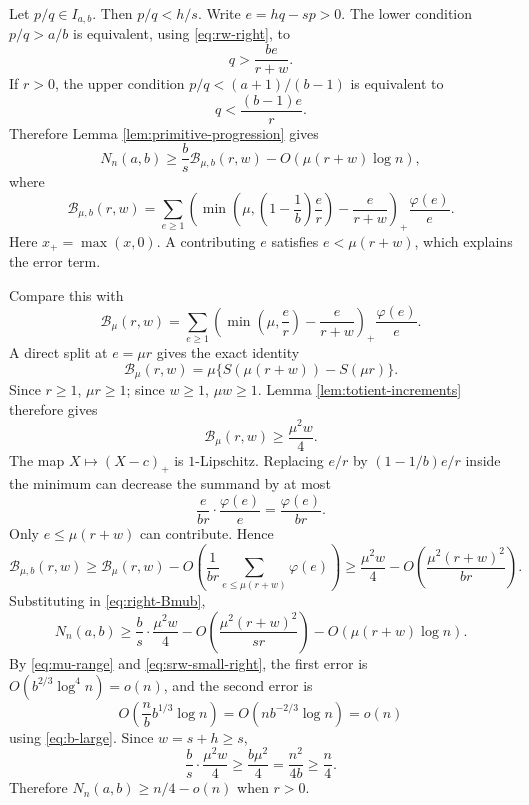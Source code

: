 \documentclass[11pt]{article}
\numberwithin{equation}{section}
\theoremstyle{definition}
\theoremstyle{remark}
\newcommand{\1}{\mathbf 1}
\begin{document}
Let $p/q\in I_{a,b}$.  Then $p/q<h/s$.  Write $e=hq-sp>0$.  The lower condition $p/q>a/b$ is equivalent, using \eqref{eq:rw-right}, to
\[
  q>\frac{be}{r+w}.
\]
If $r>0$, the upper condition $p/q<(a+1)/(b-1)$ is equivalent to
\[
  q<\frac{(b-1)e}{r}.
\]
Therefore Lemma \ref{lem:primitive-progression} gives
\begin{equation}\label{eq:right-Bmub}
  N_n(a,b)
  \ge \frac bs\mathcal B_{\mu,b}(r,w)-O(\mu(r+w)\log n),
\end{equation}
where
\[
  \mathcal B_{\mu,b}(r,w)
  =\sum_{e\ge1}
  \left(
  \min\left(\mu,\left(1-\frac1b\right)\frac er\right)
  -\frac e{r+w}
  \right)_+
  \frac{\varphi(e)}e.
\]
Here $x_+=\max(x,0)$.  A contributing $e$ satisfies $e<\mu(r+w)$, which explains the error term.

Compare this with
\[
  \mathcal B_{\mu}(r,w)
  =\sum_{e\ge1}
  \left(
  \min\left(\mu,\frac er\right)-\frac e{r+w}
  \right)_+
  \frac{\varphi(e)}e.
\]
A direct split at $e=\mu r$ gives the exact identity
\begin{equation}\label{eq:B-identity}
  \mathcal B_\mu(r,w)=\mu\{S(\mu(r+w))-S(\mu r)\}.
\end{equation}
Since $r\ge1$, $\mu r\ge1$; since $w\ge1$, $\mu w\ge1$.  Lemma \ref{lem:totient-increments} therefore gives
\begin{equation}\label{eq:B-lower}
  \mathcal B_\mu(r,w)\ge \frac{\mu^2w}{4}.
\end{equation}
The map $X\mapsto (X-c)_+$ is $1$-Lipschitz.  Replacing $e/r$ by $(1-1/b)e/r$ inside the minimum can decrease the summand by at most
\[
  \frac{e}{br}\cdot\frac{\varphi(e)}e=\frac{\varphi(e)}{br}.
\]
Only $e\le\mu(r+w)$ can contribute.  Hence
\[
  \mathcal B_{\mu,b}(r,w)
  \ge \mathcal B_\mu(r,w)
      -O\left(\frac1{br}\sum_{e\le\mu(r+w)}\varphi(e)\right)
  \ge \frac{\mu^2w}{4}
      -O\left(\frac{\mu^2(r+w)^2}{br}\right).
\]
Substituting in \eqref{eq:right-Bmub},
\begin{equation}\label{eq:right-r-positive}
  N_n(a,b)
  \ge \frac bs\cdot\frac{\mu^2w}{4}
      -O\left(\frac{\mu^2(r+w)^2}{sr}\right)
      -O(\mu(r+w)\log n).
\end{equation}
By \eqref{eq:mu-range} and \eqref{eq:srw-small-right}, the first error is $O(b^{2/3}\log^4 n)=o(n)$, and the second error is
\[
  O\left(\frac nb b^{1/3}\log n\right)=O(nb^{-2/3}\log n)=o(n)
\]
using \eqref{eq:b-large}.  Since $w=s+h\ge s$,
\[
  \frac bs\cdot\frac{\mu^2w}{4}\ge\frac{b\mu^2}{4}=\frac{n^2}{4b}\ge\frac n4.
\]
Therefore $N_n(a,b)\ge n/4-o(n)$ when $r>0$.
\end{document}
